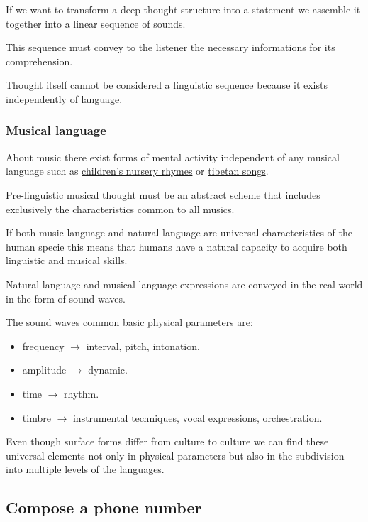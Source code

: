 If we want to transform a deep thought structure into a statement we assemble it together into a linear sequence of sounds.

This sequence must convey to the listener the necessary informations for its comprehension.

Thought itself cannot be considered a linguistic sequence because it exists independently of language.

\subsubsection{Musical language}\label{musical-language}

About music there exist forms of mental activity independent of any musical language such as \href{http://www.musicaecodice.it/gitmedia/emc/1_media/bimbi.mp3}{children's nursery rhymes} or \href{http://www.musicaecodice.it/gitmedia/emc/1_media/tibet.mp3}{tibetan songs}.

Pre-linguistic musical thought must be an abstract scheme that includes exclusively the characteristics common to all musics.

If both music language and natural language are universal characteristics of the human specie this means that humans have a natural capacity to acquire both linguistic and musical skills.

Natural language and musical language expressions are conveyed in the real world in the form of sound waves.

The sound waves common basic physical parameters are: 

\begin{itemize}
\tightlist
\item frequency \(\rightarrow\) interval, pitch, intonation. 
\item amplitude \(\rightarrow\) dynamic. 
\item time \(\rightarrow\) rhythm. 
\item timbre \(\rightarrow\) instrumental techniques, vocal expressions, orchestration.
\end{itemize}

Even though surface forms differ from culture to culture we can find these universal elements not only in physical parameters but also in the subdivision into multiple levels of the languages.

\subsection{Compose a phone number}\label{compose-a-phone-number}

